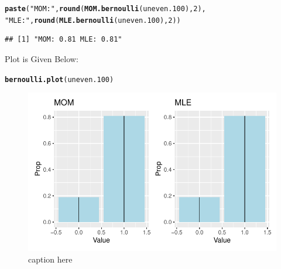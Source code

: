 \documentclass{article}\usepackage[]{graphicx}\usepackage[]{color}
\makeatletter
\def\maxwidth{ %
  \ifdim\Gin@nat@width>\linewidth
    \linewidth
  \else
    \Gin@nat@width
  \fi
}
\newcommand{\hlnum}[1]{\textcolor[rgb]{0.686,0.059,0.569}{#1}}%
\newcommand{\hlstr}[1]{\textcolor[rgb]{0.192,0.494,0.8}{#1}}%
\newcommand{\hlstd}[1]{\textcolor[rgb]{0.345,0.345,0.345}{#1}}%
\newcommand{\hlkwd}[1]{\textcolor[rgb]{0.737,0.353,0.396}{\textbf{#1}}}%
\newenvironment{kframe}{%
 \def\at@end@of@kframe{}%
 \ifinner\ifhmode%
  \def\at@end@of@kframe{\end{minipage}}%
  \begin{minipage}{\columnwidth}%
 \fi\fi%
 \def\FrameCommand##1{\hskip\@totalleftmargin \hskip-\fboxsep
 \colorbox{shadecolor}{##1}\hskip-\fboxsep
     \hskip-\linewidth \hskip-\@totalleftmargin \hskip\columnwidth}%
 \MakeFramed {\advance\hsize-\width
   \@totalleftmargin\z@ \linewidth\hsize
   \@setminipage}}%
 {\par\unskip\endMakeFramed%
 \at@end@of@kframe}
\newenvironment{knitrout}{}{} %
\makeatother
\begin{document}
\begin{enumerate}
\begin{enumerate}
\begin{knitrout}
\begin{kframe}
\begin{alltt}
\hlkwd{paste}\hlstd{(}\hlstr{"MOM:"}\hlstd{,} \hlkwd{round}\hlstd{(}\hlkwd{MOM.bernoulli}\hlstd{(uneven.100),}\hlnum{2}\hlstd{),}
      \hlstr{"MLE:"}\hlstd{,} \hlkwd{round}\hlstd{(}\hlkwd{MLE.bernoulli}\hlstd{(uneven.100),} \hlnum{2}\hlstd{))}
\end{alltt}
\begin{verbatim}
## [1] "MOM: 0.81 MLE: 0.81"
\end{verbatim}
\end{kframe}
\end{knitrout}
Plot is Given Below:
\begin{knitrout}
\color{fgcolor}\begin{kframe}
\begin{alltt}
\hlkwd{bernoulli.plot}\hlstd{(uneven.100)}
\end{alltt}
\end{kframe}
\end{knitrout}
\begin{figure}[H]
  \begin{center}
\begin{knitrout}
\color{fgcolor}
\includegraphics[width=\maxwidth]{figure/unnamed-chunk-14-1} 
\end{knitrout}
    \caption{caption here}
    \label{p4plot6}%
  \end{center}
\end{figure}

\end{enumerate}
\end{enumerate}
\end{document}
